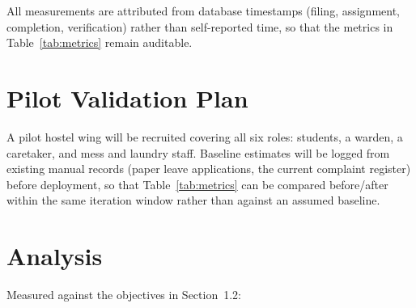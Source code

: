 \documentclass{tietreport}
\begin{document}
All measurements are attributed from database timestamps (filing,
assignment, completion, verification) rather than self-reported time, so
that the metrics in Table~\ref{tab:metrics} remain auditable.

\section{Pilot Validation Plan}
\label{sec:pilot}

A pilot hostel wing will be recruited covering all six roles: students,
a warden, a caretaker, and mess and laundry staff. Baseline estimates
will be logged from existing manual records (paper leave applications,
the current complaint register) before deployment, so that
Table~\ref{tab:metrics} can be compared before/after within the same
iteration window rather than against an assumed baseline.

\section{Analysis}

Measured against the objectives in Section~1.2:
\end{document}
